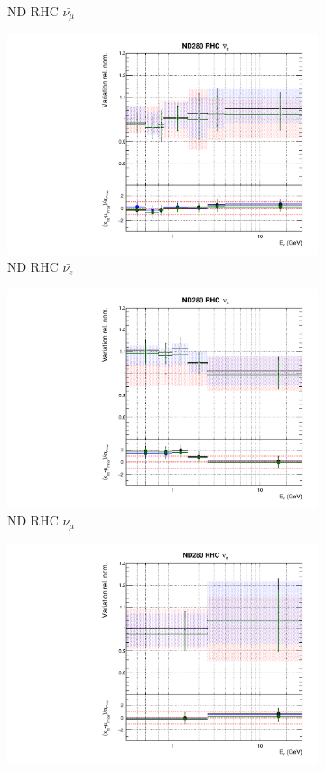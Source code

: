 \begin{figure}
\begin{subfigure}{0.24\textwidth}
  \caption{ND RHC $\bar{\nu_{\mu}}$}
\end{subfigure}
\begin{subfigure}{0.24\textwidth}
  \centering
  \includegraphics[width=0.95\linewidth]{figs/polydataflux_5}
  \caption{ND RHC $\bar{\nu_{e}}$}
\end{subfigure}
\begin{subfigure}{0.24\textwidth}
  \centering
  \includegraphics[width=0.95\linewidth]{figs/polydataflux_6}
  \caption{ND RHC $\nu_{\mu}$}
\end{subfigure}
\vspace{15mm}
\begin{subfigure}{0.24\textwidth}
  \centering
  \includegraphics[width=0.95\linewidth]{figs/polydataflux_7}

\end{subfigure}
\end{figure}
